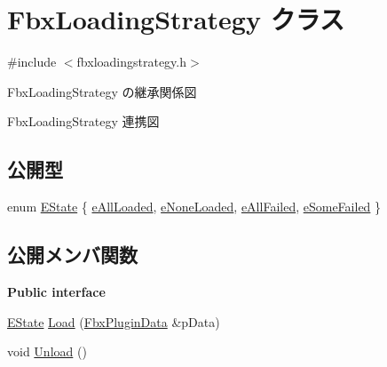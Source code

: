 \hypertarget{class_fbx_loading_strategy}{}\section{Fbx\+Loading\+Strategy クラス}
\label{class_fbx_loading_strategy}


{\ttfamily \#include $<$fbxloadingstrategy.\+h$>$}



Fbx\+Loading\+Strategy の継承関係図


Fbx\+Loading\+Strategy 連携図
\subsection*{公開型}
\begin{DoxyCompactItemize}
\item 
enum \hyperlink{class_fbx_loading_strategy_a2f61523e78f4bb06d46ccf3351d2bcdb}{E\+State} \{ \hyperlink{class_fbx_loading_strategy_a2f61523e78f4bb06d46ccf3351d2bcdbab1c0124ff0a40e7a567a96edae73b834}{e\+All\+Loaded}, 
\hyperlink{class_fbx_loading_strategy_a2f61523e78f4bb06d46ccf3351d2bcdba75e79797fc07199bda3c5f49c1825fbc}{e\+None\+Loaded}, 
\hyperlink{class_fbx_loading_strategy_a2f61523e78f4bb06d46ccf3351d2bcdba9c9b2cf75eb23ea11cc6bf91cfd04ecd}{e\+All\+Failed}, 
\hyperlink{class_fbx_loading_strategy_a2f61523e78f4bb06d46ccf3351d2bcdba18d6e8bbfd8bc1c0e9e8d8a175d4bc15}{e\+Some\+Failed}
 \}
\end{DoxyCompactItemize}
\subsection*{公開メンバ関数}
\begin{Indent}\textbf{ Public interface}\par
\begin{DoxyCompactItemize}
\item 
\hyperlink{class_fbx_loading_strategy_a2f61523e78f4bb06d46ccf3351d2bcdb}{E\+State} \hyperlink{class_fbx_loading_strategy_a3923744db719aaebabe262e2e3891d8a}{Load} (\hyperlink{struct_fbx_plugin_data}{Fbx\+Plugin\+Data} \&p\+Data)
\item 
void \hyperlink{class_fbx_loading_strategy_a53e5398383c4b2df2c8047c7d0d20581}{Unload} ()
\end{DoxyCompactItemize}
\end{Indent}
